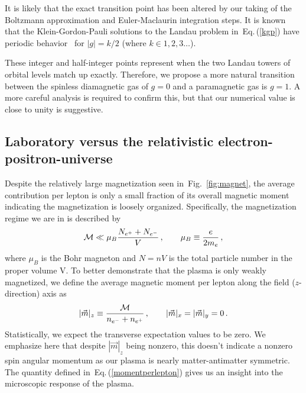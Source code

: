 \documentclass[aps,prd,floatfix,reprint]{revtex4-2}
\newcommand{\req}[1]{Eq.\,(\ref{#1})}
\newcommand{\rf}[1]{Fig.~{\ref{#1}}}
\begin{document}
It is likely that the exact transition point has been altered by our taking of the Boltzmann approximation and Euler-Maclaurin integration steps. It is known that the Klein-Gordon-Pauli solutions to the Landau problem in~\req{kgp} have periodic behavior~\cite{Steinmetz:2018ryf,Evans:2022fsu,Rafelski:2022bsv} for $|g|=k/2$ (where $k\in1,2,3\ldots$).

These integer and half-integer points represent when the two Landau towers of orbital levels match up exactly. Therefore, we propose a more natural transition between the spinless diamagnetic gas of $g=0$ and a paramagnetic gas is $g=1$. A more careful analysis is required to confirm this, but that our numerical value is close to unity is suggestive.

\subsection{Laboratory versus the relativistic electron-positron-universe}
\label{sec:perlepton}
\noindent Despite the relatively large magnetization seen in~\rf{fig:magnet}, the average contribution per lepton is only a small fraction of its overall magnetic moment indicating the magnetization is loosely organized. Specifically, the magnetization regime we are in is described by
\begin{align}
 \label{fractionalmagnetization}
 {\cal M}\ll\mu_{B}\frac{N_{e^{+}}+N_{e^{-}}}{V}\,,\qquad\mu_{B}\equiv\frac{e}{2m_{e}}\,,
\end{align}
where $\mu_{B}$ is the Bohr magneton and $N=nV$ is the total particle number in the proper volume V. To better demonstrate that the plasma is only weakly magnetized, we define the average magnetic moment per lepton along the field ($z$-direction) axis as
\begin{align}
 \label{momentperlepton}
 \vert\vec{m}\vert_{z}\equiv\frac{{\cal M}}{n_{e^{-}}+n_{e^{+}}}\,,\qquad\vert\vec{m}\vert_{x}=\vert\vec{m}\vert_{y}=0\,.
\end{align}
Statistically, we expect the transverse expectation values to be zero. We emphasize here that despite $|\vec{m}|_{z}$ being nonzero, this doesn't indicate a nonzero spin angular momentum as our plasma is nearly matter-antimatter symmetric. The quantity defined in~\req{momentperlepton} gives us an insight into the microscopic response of the plasma.
\end{document}
